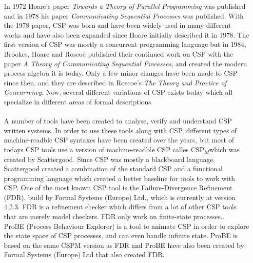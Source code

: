\documentclass[a4paper]{report}
\newcommand{\cspm}{CSP$_M$}
\begin{document}
In 1972 Hoare's paper \textit{Towards a Theory of Parallel Programming} was published  and in 1978 his paper \textit{Communicating Sequential Processes} was published. With the 1978 paper, CSP was born and have been widely used in many different works and have also been expanded since Hoare initially described it in 1978. The first version of CSP was mostly a concurrent programming language but in 1984, Brookes, Hoare and Roscoe published their continued work on CSP with the paper \textit{A Theory of Communicating Sequential Processes}\cite{Brookes1984}, and created the modern process algebra it is today. Only a few minor changes have been made to CSP since then, and they are described in Roscoe's \textit{The Theory and Practice of Concurrency}\cite{Roscoe1997}. Now, several different variations of CSP exists today which all specialize in different areas of formal descriptions.\\\\
A number of tools have been created to analyse, verify and understand CSP written systems. In order to use these tools along with CSP, different types of machine-readble CSP syntaxes have been created over the years, but most of todays CSP tools use a version of machine-readble CSP calles \cspm which was created by Scattergood\cite{Scattergood1998}. Since CSP was mostly a blackboard language, Scattergood created a combination of the standard CSP and a functional programming language which created a better baseline for tools to work with CSP. One of the most known CSP tool is the Failure-Divergence Refinement (FDR), build by Formal Systems (Europe) Ltd., which is currently at version 4.2.3\cite{fdr}. FDR is a refinement checker which differs from a lot of other CSP tools that are merely model checkers. FDR only work on finite-state processes..\\ 

ProBE (Process Behaviour Explorer)\cite{probe}  is a tool to animate CSP in order to explore the state space of CSP processes, and can even handle infinite state. ProBE is based on the same CSPM version as FDR and ProBE have also been created by Formal Systems (Europe) Ltd that also created FDR. 
\end{document}
